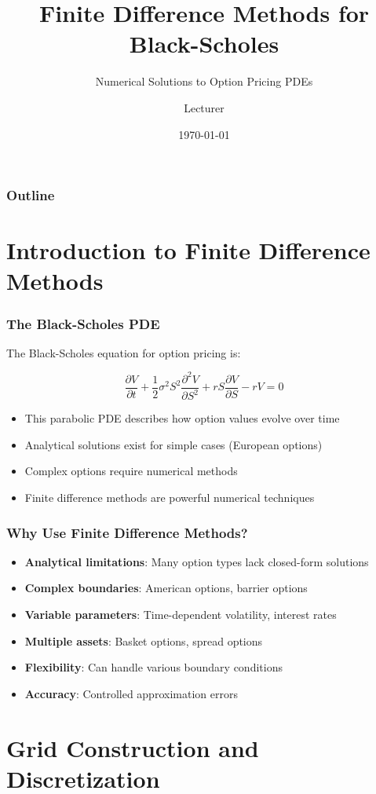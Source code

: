 \documentclass{beamer}
\title{Finite Difference Methods for Black-Scholes}
\subtitle{Numerical Solutions to Option Pricing PDEs}
\author{Lecturer}
\date{\today}
\begin{document}
\begin{frame}
\titlepage
\end{frame}

\begin{frame}
\frametitle{Outline}
\tableofcontents
\end{frame}

\section{Introduction to Finite Difference Methods}

\begin{frame}
\frametitle{The Black-Scholes PDE}
The Black-Scholes equation for option pricing is:

\[\frac{\partial V}{\partial t} + \frac{1}{2}\sigma^2 S^2 \frac{\partial^2 V}{\partial S^2} + rS \frac{\partial V}{\partial S} - rV = 0\]

\begin{itemize}
\item This parabolic PDE describes how option values evolve over time
\item Analytical solutions exist for simple cases (European options)
\item Complex options require numerical methods
\item Finite difference methods are powerful numerical techniques
\end{itemize}
\end{frame}

\begin{frame}
\frametitle{Why Use Finite Difference Methods?}
\begin{itemize}
\item \textbf{Analytical limitations}: Many option types lack closed-form solutions
\item \textbf{Complex boundaries}: American options, barrier options
\item \textbf{Variable parameters}: Time-dependent volatility, interest rates
\item \textbf{Multiple assets}: Basket options, spread options
\item \textbf{Flexibility}: Can handle various boundary conditions
\item \textbf{Accuracy}: Controlled approximation errors
\end{itemize}
\end{frame}

\section{Grid Construction and Discretization}
\end{document}
